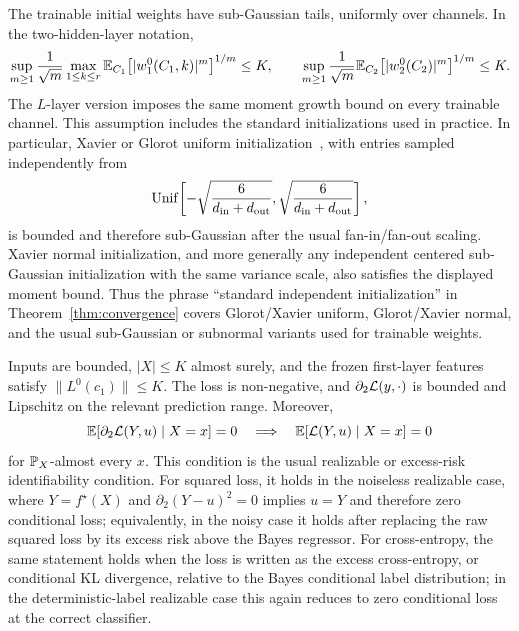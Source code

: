 \begin{assumption}
\label{assump:init}
The trainable initial weights have sub-Gaussian tails, uniformly over channels. In the two-hidden-layer notation,
\begin{equation}
\sup_{m\ge1}\frac{1}{\sqrt m}
\max_{1\le k\le r}
\mathbb{E}_{C_1}\!\left[|w_1^0(C_1,k)|^m\right]^{1/m}\le K,
\qquad
\sup_{m\ge1}\frac{1}{\sqrt m}
\mathbb{E}_{C_2}\!\left[|w_2^0(C_2)|^m\right]^{1/m}\le K .
\end{equation}
The $L$-layer version imposes the same moment growth bound on every trainable channel.
This assumption includes the standard initializations used in practice. In particular, Xavier or Glorot uniform initialization~\cite{glorot2010}, with entries sampled independently from
\[
\operatorname{Unif}\!\left[-\sqrt{\frac{6}{d_{\rm in}+d_{\rm out}}},
\sqrt{\frac{6}{d_{\rm in}+d_{\rm out}}}\right],
\]
is bounded and therefore sub-Gaussian after the usual fan-in/fan-out scaling. Xavier normal initialization, and more generally any independent centered sub-Gaussian initialization with the same variance scale, also satisfies the displayed moment bound. Thus the phrase ``standard independent initialization'' in Theorem~\ref{thm:convergence} covers Glorot/Xavier uniform, Glorot/Xavier normal, and the usual sub-Gaussian or subnormal variants used for trainable weights.
\end{assumption}

\begin{assumption}
\label{assump:data}
\label{assump:loss}
Inputs are bounded, $|X|\le K$ almost surely, and the frozen first-layer features satisfy $\|L^0(c_1)\|\le K$. The loss is non-negative, and $\partial_2\mathcal{L}(y,\cdot)$ is bounded and Lipschitz on the relevant prediction range. Moreover,
\begin{equation}
\mathbb{E}[\partial_2\mathcal{L}(Y,u)\mid X=x]=0
\quad\Longrightarrow\quad
\mathbb{E}[\mathcal{L}(Y,u)\mid X=x]=0
\label{eq:loss-identifiability}
\end{equation}
for $\mathbb{P}_X$-almost every $x$.
This condition is the usual realizable or excess-risk identifiability condition. For squared loss, it holds in the noiseless realizable case, where $Y=f^\star(X)$ and $\partial_2 (Y-u)^2=0$ implies $u=Y$ and therefore zero conditional loss; equivalently, in the noisy case it holds after replacing the raw squared loss by its excess risk above the Bayes regressor. For cross-entropy, the same statement holds when the loss is written as the excess cross-entropy, or conditional KL divergence, relative to the Bayes conditional label distribution; in the deterministic-label realizable case this again reduces to zero conditional loss at the correct classifier.
\end{assumption}

